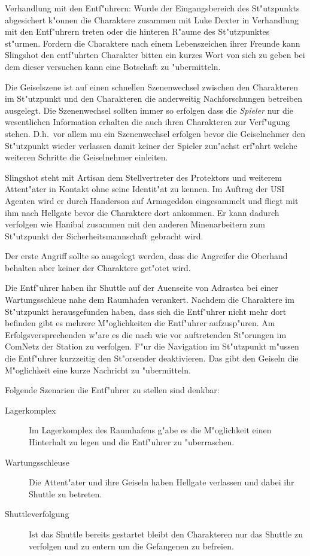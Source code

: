 Verhandlung mit den Entf"uhrern: Wurde der Eingangsbereich des St"utzpunkts abgesichert k"onnen die Charaktere zusammen mit Luke Dexter in Verhandlung mit den Entf"uhrern treten oder die hinteren R"aume des St"utzpunktes st"urmen. Fordern die Charaktere nach einem Lebenszeichen ihrer Freunde kann Slingshot den entf"uhrten Charakter bitten ein kurzes Wort von sich zu geben bei dem dieser versuchen kann eine Botschaft zu "ubermitteln.

\begin{remarks}
	Die Geiselszene ist auf einen schnellen Szenenwechsel zwischen den Charakteren im St"utzpunkt und den Charakteren die anderweitig Nachforschungen betreiben ausgelegt. Die Szenenwechsel sollten immer so erfolgen dass die \emph{Spieler} nur die wesentlichen Information erhalten die auch ihren Charakteren zur Verf"ugung stehen. D.h.~vor allem mu\3 ein Szenenwechsel erfolgen bevor die Geiselnehmer den St"utzpunkt wieder verlassen damit keiner der Spieler zun"achst erf"ahrt welche weiteren Schritte die Geiselnehmer einleiten.

	Slingshot steht mit Artisan dem Stellvertreter des Protektors und weiterem Attent"ater in Kontakt ohne seine Identit"at zu kennen. Im Auftrag der USI Agenten wird er durch Handerson auf Armageddon eingesammelt und fliegt mit ihm nach Hellgate bevor die Charaktere dort ankommen. Er kann dadurch verfolgen wie Hanibal zusammen mit den anderen Minenarbeitern zum St"utzpunkt der Sicherheitsmannschaft gebracht wird.

	Der erste Angriff sollte so ausgelegt werden, dass die Angreifer die Oberhand behalten aber keiner der Charaktere get"otet wird.
\end{remarks}



Die Entf"uhrer haben ihr Shuttle auf der Au\3enseite von Adrastea bei einer Wartungsschleu\3e nahe dem Raumhafen verankert. Nachdem die Charaktere im St"utzpunkt herausgefunden haben, dass sich die Entf"uhrer nicht mehr dort befinden gibt es mehrere M"oglichkeiten die Entf"uhrer aufzusp"uren. Am Erfolgsversprechenden w"are es die nach wie vor auftretenden St"orungen im ComNetz der Station zu verfolgen. F"ur die Navigation im St"utzpunkt m"ussen die Entf"uhrer kurzzeitig den St"orsender deaktivieren. Das gibt den Geiseln die M"oglichkeit eine kurze Nachricht zu "ubermitteln.

Folgende Szenarien die Entf"uhrer zu stellen sind denkbar:

\begin{description}
	\item [Lagerkomplex] Im Lagerkomplex des Raumhafens g"abe es die M"oglichkeit einen Hinterhalt zu legen und die Entf"uhrer zu 		
		"uberraschen.
	\item [Wartungsschleuse] Die Attent"ater und ihre Geiseln haben Hellgate verlassen und dabei ihr Shuttle zu betreten.
	\item [Shuttleverfolgung] Ist das Shuttle bereits gestartet bleibt den Charakteren nur das Shuttle zu verfolgen und zu entern um die 	
		Gefangenen zu befreien.
\end{description}


